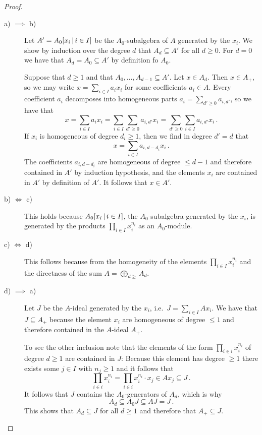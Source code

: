 \begin{proof}
  \leavevmode
  \begin{description}
    \item[a) $\implies$ b)]
      Let $A' = A_0[x_i \suchthat i \in I]$ be the $A_0$-subalgebra of $A$ generated by the $x_i$.
      We show by induction over the degree $d$ that $A_d \subseteq A'$ for all $d \geq 0$.
      For $d = 0$ we have that $A_d = A_0 \subseteq A'$ by definition fo $A_0$.
      
      Suppose that $d \geq 1$ and that $A_0, \dotsc, A_{d-1} \subseteq A'$.
      Let $x \in A_d$.
      Then $x \in A_+$, so we may write $x = \sum_{i \in I} a_i x_i$ for some coefficients $a_i \in A$.
      Every coefficient $a_i$ decomposes into homogeneous parts $a_i = \sum_{d' \geq 0} a_{i,d'}$, so we have that
      \[
          x
        = \sum_{i \in I} a_i x_i
        = \sum_{i \in I} \sum_{d' \geq 0} a_{i,d'} x_i
        = \sum_{d' \geq 0} \sum_{i \in I} a_{i,d'} x_i \,.
      \]
      If $x_i$ is homogeneous of degree $d_i \geq 1$, then we find in degree $d' = d$ that
      \[
          x
        = \sum_{i \in I} a_{i,d-d_i} x_i \,.
      \]
      The coefficients $a_{i,d-d_i}$ are homogeneous of degree $\leq d-1$ and therefore contained in $A'$ by induction hypothesis, and the elements $x_i$ are contained in $A'$ by definition of $A'$.
      It follows that $x \in A'$.
    \item[b) $\iff$ c)]
      This holds because $A_0[x_i \suchthat i \in I]$, the $A_0$-subalgebra generated by the $x_i$, is generated by the products $\prod_{i \in I} x_i^{n_i}$ as an $A_0$-module.
    \item[c) $\iff$ d)]
      This follows because from the homogeneity of the elements $\prod_{i \in I} x_i^{n_i}$ and the directness of the sum $A = \bigoplus_{d \geq  } A_d$.
    \item[d) $\implies$ a)]
      Let $J$ be the $A$-ideal generated by the $x_i$, i.e.\ $J = \sum_{i \in I} A x_i$.
      We have that $J \subseteq A_+$ because the element $x_i$ are homogeneous of degree $\leq 1$ and therefore contained in the $A$-ideal $A_+$.
      
      To see the other inclusion note that the elements of the form $\prod_{i \in i} x_i^{n_i}$ of degree $d \geq 1$ are contained in $J$:
      Because this element has degree $\geq 1$ there exists some $j \in I$ with $n_j \geq 1$ and it follows that
      \[
                  \prod_{i \in i} x_i^{n_i}
        =         \prod_{i \in i} x_i^{n_i} \cdot x_j
        \in       A x_j
        \subseteq J \,.
      \]
      It follows that $J$ contains the $A_0$-generators of $A_d$, which is why
      \[
                  A_d
        \subseteq A_0 J
        \subseteq A J
        =         J \,.
      \]
      This shows that $A_d \subseteq J$ for all $d \geq 1$ and therefore that $A_+ \subseteq J$.
    \qedhere
  \end{description}
\end{proof}


